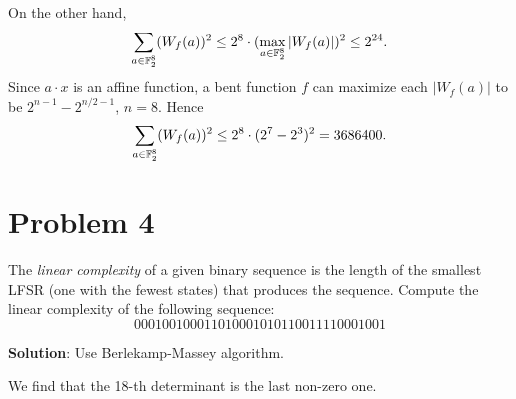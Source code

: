 \documentclass[12pt]{article}
\theoremstyle{plain}
\begin{document}
On the other hand, 
$$\sum_{a \in \mathbb{F}_2^8}(W_f(a))^2 \leq 2^8 \cdot (\max_{a\in\mathbb{F}_2^8}|W_f(a)|)^2 \leq 2^{24}.$$
Since $a\cdot x$ is an affine function, a bent function $f$ can maximize each $|W_f(a)|$ to be $2^{n-1} - 2^{n/2-1}$, $n=8$. Hence
$$\sum_{a \in \mathbb{F}_2^8}(W_f(a))^2 \leq 2^8 \cdot (2^7-2^3)^2 = 3686400.$$

\section{Problem 4}
The \emph{linear complexity} of a given binary sequence is the length of the
smallest LFSR (one with the fewest states) that produces the sequence.
Compute the linear complexity of the following sequence:
$$000100100011010001010110011110001001$$

{\bf Solution}: Use Berlekamp-Massey algorithm.

We find that the 18-th determinant is the last non-zero one. 
\end{document}
